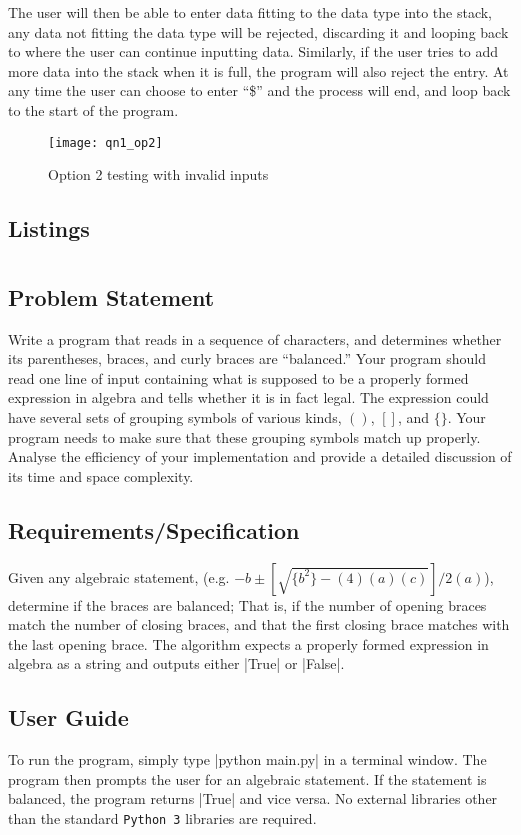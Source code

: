 \documentclass{report}
\begin{document}
The user will then be able to enter data fitting to the data type into the stack, any data not fitting the data type will be rejected, discarding it and looping back to where the user can continue inputting data. Similarly, if the user tries to add more data into the stack when it is full, the program will also reject the entry. At any time the user can choose to enter ``\$'' and the process will end, and loop back to the start of the program.

\begin{figure}[H]
	\centering
	\caption{Option 2 testing with invalid inputs}
	\texttt{[image: qn1\_op2]}
	\label{fig:qn1_op2}
\end{figure}
\section{Listings}
\chapter{}
\section{Problem Statement}
Write a program that reads in a sequence of characters, and determines whether its parentheses, braces, and curly braces are ``balanced.'' Your program should read one line of input containing what is supposed to be a properly formed expression in algebra and tells whether it is in fact legal. The expression could have several sets of grouping symbols of various kinds, \(()\), \([]\), and \(\{\}\). Your program needs to make sure that these grouping symbols match up properly. Analyse the efficiency of your implementation and provide a detailed discussion of its time and space complexity.
\section{Requirements/Specification}
Given any algebraic statement, (e.g. \(-b \pm \left[\sqrt{\{b^2\}-(4)(a)(c)}\right]/2(a)\)), determine if the braces are balanced; That is, if the number of opening braces match the number of closing braces, and that the first closing brace matches with the last opening brace. The algorithm expects a properly formed expression in algebra as a string and outputs either |True| or |False|.
\section{User Guide}
To run the program, simply type |python main.py| in a terminal window. The program then prompts the user for an algebraic statement. If the statement is balanced, the program returns |True| and vice versa. No external libraries other than the standard \texttt{Python 3} libraries are required.
\end{document}
